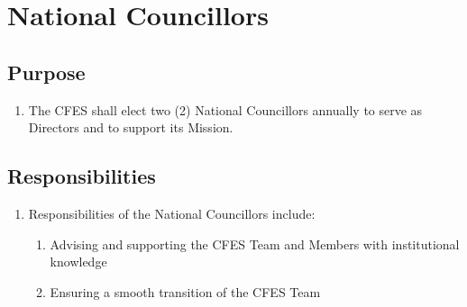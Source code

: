 \section{National Councillors}
\label{national-councillors}

\subsection{Purpose}
\label{national-councillors-purpose}

\begin{enumerate}
 \item The CFES shall elect two (2) National Councillors annually to serve as Directors and to support its Mission.
\end{enumerate}

\subsection{Responsibilities}
\label{national-councillors-responsibilities}

\begin{enumerate}
 \item Responsibilities of the National Councillors include:
  \begin{enumerate}
   \item Advising and supporting the CFES Team and Members with institutional knowledge
   \item Ensuring a smooth transition of the CFES Team
  \end{enumerate}
\end{enumerate}
